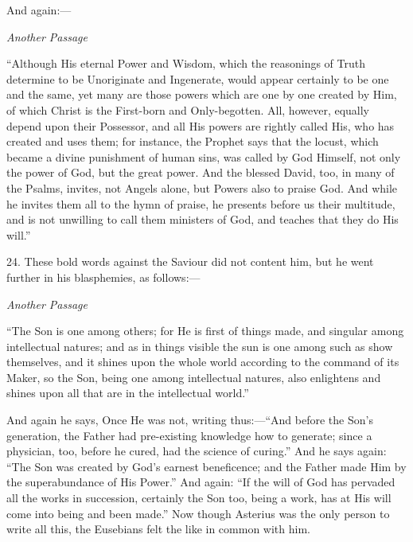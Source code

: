 And again:—

\emph{Another
Passage}

``Although His eternal Power
and Wisdom, which the reasonings of Truth determine to be Unoriginate
and Ingenerate, would appear certainly to be one and the same, yet
many are those powers which are one by one created by Him, of which
Christ is the First-born and Only-begotten. All, however, equally
depend upon their Possessor, and all His powers are rightly called
His, who has created and uses them; for instance, the Prophet says
that the locust, which became a divine punishment of human sins, was
called by God Himself, not only the power of God, but the great power.
And the blessed David, too, in many of the Psalms, invites, not Angels
alone, but Powers also to praise God. And while he invites them all to
the hymn of praise, he presents before us their multitude, and is not
unwilling to call them ministers of God, and teaches that they do His
will.''

24. These bold words against
the Saviour did not content him, but he went further in his
blasphemies, as follows:—

\emph{Another
Passage}

``The Son is one among others;
for He is first of things made, and singular among intellectual
natures; and as in things visible the sun is one among such as show
themselves, and it shines upon the whole world according to the
command of its Maker, so the Son, being one among intellectual
natures, also enlightens and shines upon all that are in the
intellectual world.''

And again he says, Once He was
not, writing thus:—``And before the Son's generation, the Father had
pre-existing knowledge how to generate; since a physician, too, before
he cured, had the science of curing.'' And he says again: ``The Son was
created by God's earnest beneficence; and the Father made Him by the
superabundance of His Power.'' And again: ``If the will of God has
pervaded all the works in succession, certainly the Son too, being a
work, has at His will come into being and been made.'' Now though
Asterius was the only person to write all this, the Eusebians felt the
like in common with him.

